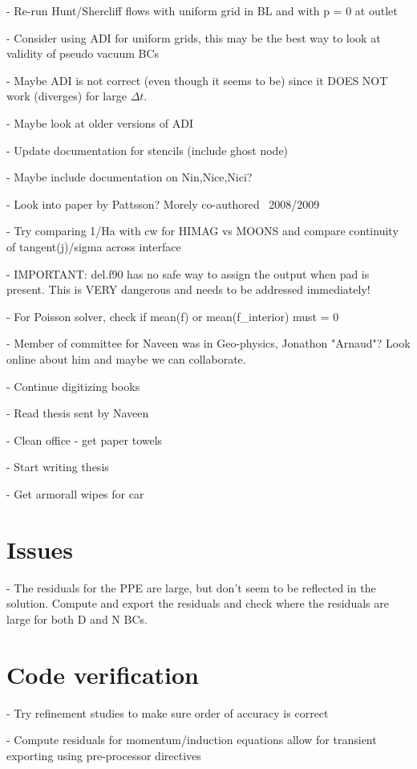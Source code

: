 \documentclass[11pt]{article}
\begin{document}
- Re-run Hunt/Shercliff flows with uniform grid in BL and with p = 0 at outlet

- Consider using ADI for uniform grids, this may be the best way to look at validity of pseudo vacuum BCs

- Maybe ADI is not correct (even though it seems to be) since it DOES NOT work (diverges) for large $\Delta t$.

- Maybe look at older versions of ADI

- Update documentation for stencils (include ghost node)

- Maybe include documentation on Nin,Nice,Nici?

- Look into paper by Pattsson? Morely co-authored ~2008/2009

- Try comparing 1/Ha with cw for HIMAG vs MOONS and compare continuity of tangent(j)/sigma across interface

- IMPORTANT: del.f90 has no safe way to assign the output when pad is present. This is VERY dangerous and needs to be addressed immediately!

- For Poisson solver, check if mean(f) or mean(f\_interior) must = 0

- Member of committee for Naveen was in Geo-physics, Jonathon "Arnaud"? Look online about him and maybe we can collaborate.

- Continue digitizing books

- Read thesis sent by Naveen

- Clean office - get paper towels

- Start writing thesis

- Get armorall wipes for car

\section{Issues}

- The residuals for the PPE are large, but don't seem to be reflected in the solution. Compute and export the residuals and check where the residuals are large for both D and N BCs.

\section{Code verification}

- Try refinement studies to make sure order of accuracy is correct

- Compute residuals for momentum/induction equations allow for transient exporting using pre-processor directives
\end{document}
